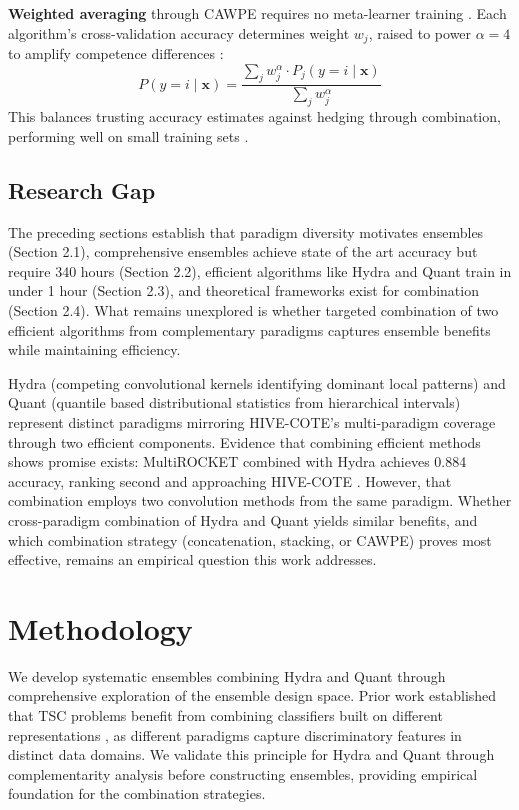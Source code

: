 \documentclass[pdflatex,sn-basic]{sn-jnl}           %
\theoremstyle{thmstyleone}%
\theoremstyle{thmstyletwo}%
\theoremstyle{thmstylethree}%
\begin{document}
\textbf{Weighted averaging} through CAWPE requires no meta-learner training \citep{cawpe}. Each algorithm's cross-validation accuracy determines weight $w_j$, raised to power $\alpha=4$ to amplify competence differences \citep[p.~1675]{cawpe}:
\begin{equation}
P(y=i \mid \mathbf{x}) = \frac{\sum_j w_j^\alpha \cdot P_j(y=i \mid \mathbf{x})}{\sum_j w_j^\alpha}
\end{equation}
This balances trusting accuracy estimates against hedging through combination, performing well on small training sets \citep[Table~3, p.~1693]{cawpe}.

\subsection{Research Gap}

The preceding sections establish that paradigm diversity motivates ensembles (Section 2.1), comprehensive ensembles achieve state of the art accuracy but require 340 hours (Section 2.2), efficient algorithms like Hydra and Quant train in under 1 hour (Section 2.3), and theoretical frameworks exist for combination (Section 2.4). What remains unexplored is whether targeted combination of two efficient algorithms from complementary paradigms captures ensemble benefits while maintaining efficiency.

Hydra (competing convolutional kernels identifying dominant local patterns) and Quant (quantile based distributional statistics from hierarchical intervals) represent distinct paradigms mirroring HIVE-COTE's multi-paradigm coverage through two efficient components. Evidence that combining efficient methods shows promise exists: MultiROCKET combined with Hydra achieves 0.884 accuracy, ranking second and approaching HIVE-COTE \citep[Table~14, p.~2008]{bakeoff-redux}. However, that combination employs two convolution methods from the same paradigm. Whether cross-paradigm combination of Hydra and Quant yields similar benefits, and which combination strategy (concatenation, stacking, or CAWPE) proves most effective, remains an empirical question this work addresses.


\section{Methodology}\label{sec3}

We develop systematic ensembles combining Hydra and Quant through comprehensive exploration of the ensemble design space. Prior work established that TSC problems benefit from combining classifiers built on different representations \citep[p.~3213]{hive-cote-2}, as different paradigms capture discriminatory features in distinct data domains. We validate this principle for Hydra and Quant through complementarity analysis before constructing ensembles, providing empirical foundation for the combination strategies.
\end{document}
